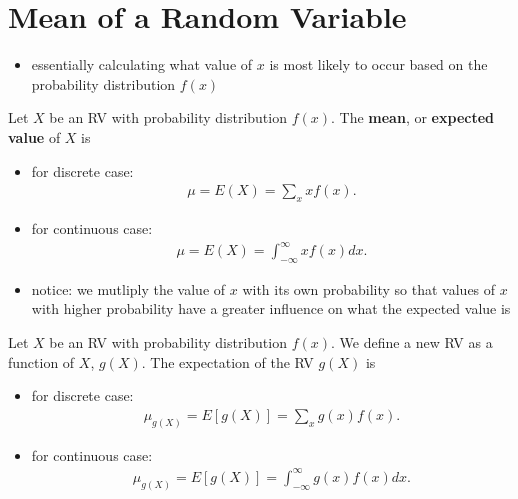 \documentclass[10pt]{article}
\begin{document}
\section{Mean of a Random Variable}
\begin{itemize}
    \item essentially calculating what value of $x$ is most likely to occur based on the probability distribution $f(x)$
\end{itemize}
\begin{definition}
    Let $X$ be an RV with probability distribution $f(x)$. The \textbf{mean}, or \textbf{expected value} of $X$ is  
    \begin{itemize}
        \item for discrete case:
            \begin{align*}
                \mu = E(X) = \sum_{x} xf(x)
            .\end{align*}
        \item for continuous case:
            \begin{align*}
                \mu = E(X) = \int_{-\infty}^{\infty} xf(x) dx 
            .\end{align*}
    \end{itemize}
\end{definition}
\begin{itemize}
    \item notice: we mutliply the value of $x$ with its own probability so that values of $x$ with higher probability have a greater influence on what the expected value is
\end{itemize}
\begin{definition}
    Let $X$ be an RV with probability distribution $f(x)$. We define a new RV as a function of $X$, $g(X)$. The expectation of the RV $g(X)$ is 
    \begin{itemize}
        \item for discrete case:
            \begin{align*}
                \mu_{g(X)} = E [g(X)] = \sum_{x} g(x) f(x)
            .\end{align*}
        \item for continuous case:
            \begin{align*}
                \mu_{g(X)} = E[g(X)] = \int_{-\infty}^{\infty} g(x)f(x) dx 
            .\end{align*}
    \end{itemize}
\end{definition}
\end{document}
